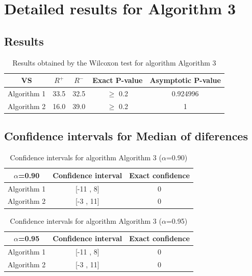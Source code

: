\documentclass[a4paper,10pt]{article}
\begin{document}
 \clearpage 


\section{Detailed results for Algorithm 3}


\subsection{Results}

\begin{table}[!htp]
\centering\small
\begin{tabular}{
|c|c|c|c|c|}
\hline
 VS & $R^{+}$ & $R^{-}$ & Exact P-value & Asymptotic P-value \\ \hline 
Algorithm 1 & 33.5 & 32.5 & $\geq$ 0.2 & 0.924996\\ \hline 
Algorithm 2 & 16.0 & 39.0 & $\geq$ 0.2 & 1\\ \hline 

\end{tabular}
\caption{Results obtained by the Wilcoxon test for algorithm Algorithm 3}
\end{table}

\subsection{Confidence intervals for Median of diferences}

\begin{table}[!htp]
\centering\small
\begin{tabular}{
|c|c|c|}
\hline
 $\alpha$=0.90 & Confidence interval & Exact confidence \\ \hline 
Algorithm 1 & [-11 , 8] & 0\\ \hline 
Algorithm 2 & [-3 , 11] & 0\\ \hline 

\end{tabular}
\caption{Confidence intervals for algorithm Algorithm 3 ($\alpha$=0.90)}
\end{table}
\begin{table}[!htp]
\centering\small
\begin{tabular}{
|c|c|c|}
\hline
 $\alpha$=0.95 & Confidence interval & Exact confidence \\ \hline 
Algorithm 1 & [-11 , 8] & 0\\ \hline 
Algorithm 2 & [-3 , 11] & 0\\ \hline 

\end{tabular}
\caption{Confidence intervals for algorithm Algorithm 3 ($\alpha$=0.95)}
\end{table}

 \clearpage 
\end{document}
